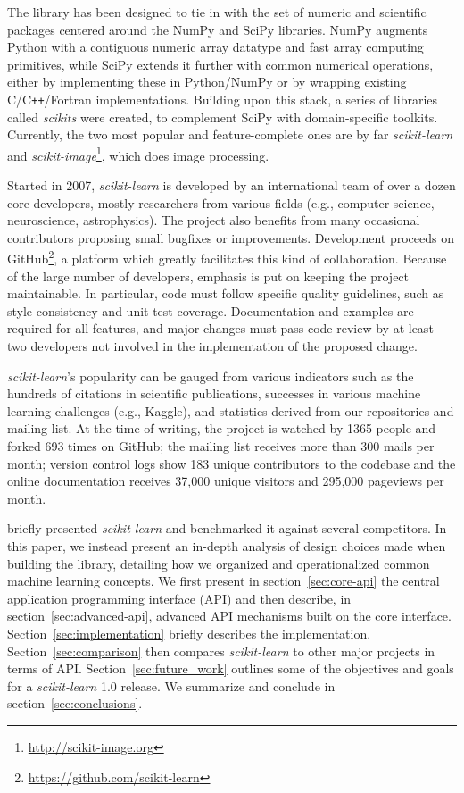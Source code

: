 \documentclass{llncs}
\newcommand{\sklearn}{\textit{scikit-learn}\xspace}
\begin{document}
The library has been designed to tie in with the set of numeric
and scientific packages centered around the NumPy and SciPy libraries. NumPy
\citep{vanderwalt2011} augments Python with a contiguous numeric array datatype
and fast array computing primitives,
while SciPy \citep{varoquaux2013scipy} extends it
further with common numerical operations, either by implementing
these in Python/NumPy or by wrapping existing C/C{}\verb!++!/Fortran
implementations. Building upon this stack, a series of libraries called
\textit{scikits} were created, to complement SciPy with
domain-specific toolkits. Currently, the two most popular and feature-complete
ones are by far \sklearn and
\textit{scikit-image}\footnote{\url{http://scikit-image.org}},
which does image processing.

Started in 2007, \sklearn is developed by an international team of over a dozen
core developers, mostly researchers from various fields (e.g.,
computer science, neuroscience, astrophysics). The project also benefits
from many occasional contributors proposing small bugfixes or
improvements. Development proceeds on GitHub\footnote{\url{https://github.com/scikit-learn}},
a platform which greatly facilitates this kind of
collaboration. Because of the large number of developers, emphasis is
put on keeping the project maintainable. In particular, code must follow
specific quality guidelines, such as style consistency and unit-test coverage.
Documentation and examples are required for all features,
and major changes must pass code review by at least two
developers not involved in the implementation of the proposed change.

\sklearn's popularity can be gauged from various indicators such as the hundreds
of citations in scientific publications, successes in various machine learning
challenges (e.g., Kaggle), and statistics derived from our
repositories and mailing list.  At the time of writing, the project is watched
by 1365 people and forked 693 times on GitHub; the mailing list receives more
than 300 mails per month; version control logs
show 183 unique contributors to the codebase and the online documentation
receives 37,000 unique visitors and 295,000 pageviews per month.

\citet{pedregosa2011} briefly presented \sklearn and
benchmarked it against several competitors.
In this paper, we instead present an
in-depth analysis of design choices made when building the library,
detailing how we organized and operationalized
common machine learning concepts.
We first present in section~\ref{sec:core-api} the central application
programming interface (API) and then describe, in section~\ref{sec:advanced-api},
advanced API mechanisms built on the core interface.
Section~\ref{sec:implementation} briefly describes the implementation.
Section~\ref{sec:comparison} then
compares \sklearn to other major projects in terms of API\@.
Section~\ref{sec:future_work} outlines some of the objectives and goals for
a \sklearn 1.0 release.
We summarize and conclude in section~\ref{sec:conclusions}.
\end{document}
